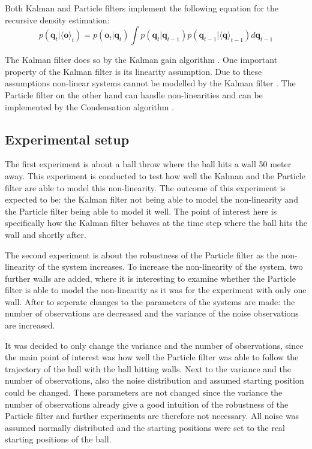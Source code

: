 \documentclass[conference]{IEEEtran}
\begin{document}
Both Kalman and Particle filters implement the following equation for the recursive density estimation:
\begin{equation*}
    p(\textbf{q}_t | \langle \textbf{o} \rangle _t) =
    p(\textbf{o}_t | \textbf{q}_t) \int p(\textbf{q}_t | \textbf{q}_{t-1}) p(\textbf{q}_{t-1} | \langle \textbf{q} \rangle _{t-1}) d \textbf{q}_{t-1}
\tag{5}
\end{equation*}

The Kalman filter does so by the Kalman gain algorithm \cite{b2}.
One important property of the Kalman filter is its linearity assumption.
Due to these assumptions non-linear systems cannot be modelled by the Kalman filter \cite{b2}. %
The Particle filter on the other hand can handle non-linearities and can be implemented by the Condensation algorithm \cite{b3}. 


\subsection{Experimental setup}

The first experiment is about a ball throw where the ball hits a wall 50 meter away.
This experiment is conducted to test how well the Kalman and the Particle filter are able to model this non-linearity. 
The outcome of this experiment is expected to be: the Kalman filter not being able to model the non-linearity and the Particle filter being able to model it well.
The point of interest here is specifically how the Kalman filter behaves at the time step where the ball hits the wall and shortly after.  

The second experiment is about the robustness of the Particle filter as the non-linearity of the system increases.
To increase the non-linearity of the system, two further walls are added, where it is interesting to examine whether the Particle filter is able to model the non-linearity as it was for the experiment with only one wall. 
After to seperate changes to the parameters of the systems are made: the number of observations are decreased and the variance of the noise observations are increased.

It was decided to only change the variance and the number of observations, since the main point of interest was how well the Particle filter was able to follow the trajectory of the ball with the ball hitting walls.
Next to the variance and the number of observations, also the noise distribution and assumed starting position could be changed.
These parameters are not changed since the variance the number of observations already give a good intuition of the robustness of the Particle filter and further experiments are therefore not necessary.
All noise was assumed normally distributed and the starting positions were set to the real starting positions of the ball.
\end{document}
